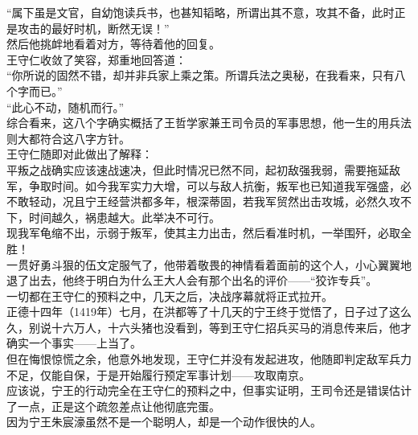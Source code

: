 \begin{multicols}{\theparacolNo}
“属下虽是文官，自幼饱读兵书，也甚知韬略，所谓出其不意，攻其不备，此时正是攻击的最好时机，断然无误！”\\

然后他挑衅地看着对方，等待着他的回复。\\

王守仁收敛了笑容，郑重地回答道：\\

“你所说的固然不错，却并非兵家上乘之策。所谓兵法之奥秘，在我看来，只有八个字而已。”\\

“此心不动，随机而行。”\\

综合看来，这八个字确实概括了王哲学家兼王司令员的军事思想，他一生的用兵法则大都符合这八字方针。\\

王守仁随即对此做出了解释：\\

平叛之战确实应该速战速决，但此时情况已然不同，起初敌强我弱，需要拖延敌军，争取时间。如今我军实力大增，可以与敌人抗衡，叛军也已知道我军强盛，必不敢轻动，况且宁王经营洪都多年，根深蒂固，若我军贸然出击攻城，必然久攻不下，时间越久，祸患越大。此举决不可行。\\

现我军龟缩不出，示弱于叛军，使其主力出击，然后看准时机，一举围歼，必取全胜！\\

一贯好勇斗狠的伍文定服气了，他带着敬畏的神情看着面前的这个人，小心翼翼地退了出去，他终于明白为什么王大人会有那个出名的评价——“狡诈专兵”。\\

一切都在王守仁的预料之中，几天之后，决战序幕就将正式拉开。\\

正德十四年（1419年）七月，在洪都等了十几天的宁王终于觉悟了，日子过了这么久，别说十六万人，十六头猪也没看到，等到王守仁招兵买马的消息传来后，他才确实一个事实——上当了。\\

但在悔恨惊慌之余，他意外地发现，王守仁并没有发起进攻，他随即判定敌军兵力不足，仅能自保，于是开始履行预定军事计划——攻取南京。\\

应该说，宁王的行动完全在王守仁的预料之中，但事实证明，王司令还是错误估计了一点，正是这个疏忽差点让他彻底完蛋。\\

因为宁王朱宸濠虽然不是一个聪明人，却是一个动作很快的人。\\


\end{multicols}

